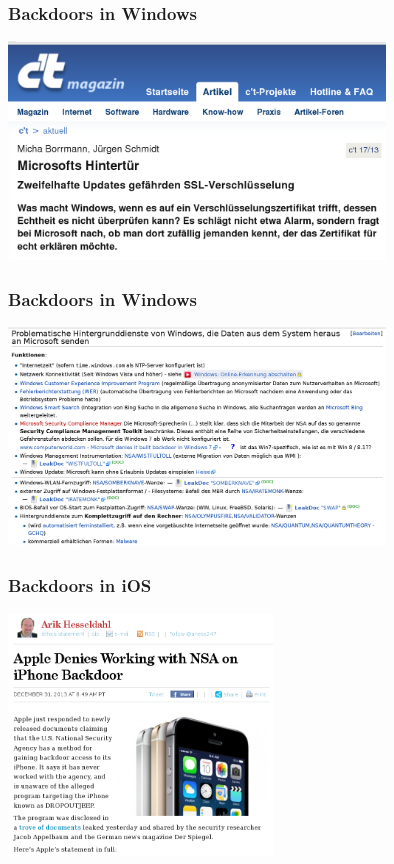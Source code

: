 \documentclass[12pt]{beamer}
\begin{document}
\begin{frame}
  \frametitle{Backdoors in Windows}
  \begin{center}
    \includegraphics[width=10cm]{img/backdoor-windows}
  \par\end{center}
\end{frame}

\begin{frame}
  \frametitle{Backdoors in Windows}
  \begin{center}
    \includegraphics[width=10cm]{img/backdoor-windows2}
  \par\end{center}
\end{frame}

\begin{frame}
  \frametitle{Backdoors in iOS}
  \begin{center}
    \includegraphics[width=7cm]{img/backdoor-ios}
  \par\end{center}
\end{frame}
\end{document}
